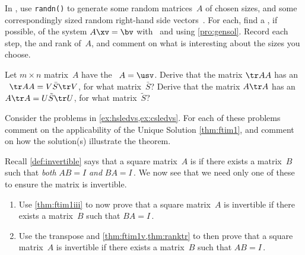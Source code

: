 \begin{exercise}  
In \script, use \verb|randn()| to generate some random matrices~\(A\) of chosen sizes, and some correspondingly sized random right-hand side vectors~\bv.
For each, find a , if possible, of the system \(A\xv=\bv\) with \script\ and using \cref{pro:gensol}.
Record each step, the  and rank of~\(A\), and comment on what is interesting about the sizes you choose.
\end{exercise}


\begin{exercise} \label{ex:svdtrAA} 
Let \(m\times n\) matrix~\(A\) have the \svd\ \(A=\usv\).
Derive that the matrix \(\tr AA\) has an \svd\ \(\tr AA=V\bar S\tr V\), for what matrix~\(\bar S\)?
Derive that the matrix \(A\tr A\) has an \svd\ \(A\tr A=U\tilde S\tr U\), for what matrix~\(\tilde S\)?
\end{exercise}




\begin{exercise}  
Consider the problems in \cref{ex:hsledvs,ex:csledvs}.
For each of these problems comment on the applicability of the Unique Solution \cref{thm:ftim1}, and comment on how the solution(s) illustrate the theorem.
\end{exercise}



\begin{exercise}  
Recall \cref{def:invertible} says that a square matrix~\(A\) is  if there exists a matrix~\(B\) such that \emph{both} \(AB=I\) \emph{and} \(BA=I\)\,.
We now see that we need only one of these to ensure the matrix is invertible.
\begin{enumerate}
\item Use \cref{thm:ftim1iii} to now prove that a square matrix~\(A\) is invertible if there exists a matrix~\(B\) such that \(BA=I\)\,.

\item Use the transpose and \cref{thm:ftim1v,thm:ranktr} to then prove that a square matrix~\(A\) is invertible if there exists a matrix~\(B\) such that \(AB=I\)\,.
\end{enumerate}
\end{exercise}




